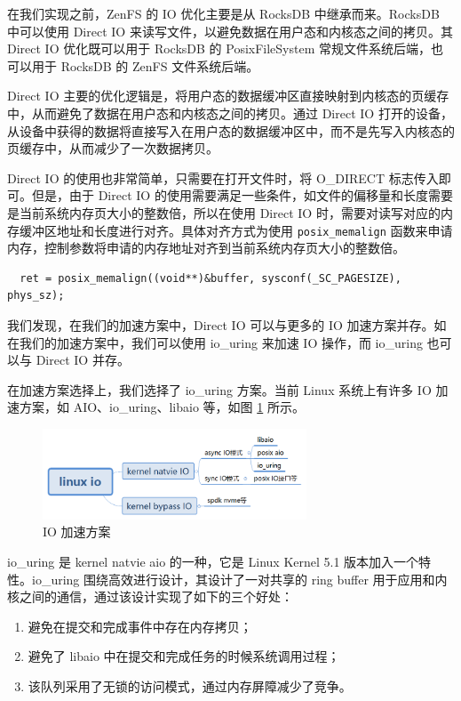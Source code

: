 在我们实现之前，ZenFS 的 IO 优化主要是从 RocksDB 中继承而来。RocksDB 中可以使用 Direct IO \cite{bjorling_linux_2013} 来读写文件，以避免数据在用户态和内核态之间的拷贝。其 Direct IO 优化既可以用于 RocksDB 的 PosixFileSystem 常规文件系统后端，也可以用于 RocksDB 的 ZenFS 文件系统后端。

Direct IO 主要的优化逻辑是，将用户态的数据缓冲区直接映射到内核态的页缓存中，从而避免了数据在用户态和内核态之间的拷贝。通过 Direct IO 打开的设备，从设备中获得的数据将直接写入在用户态的数据缓冲区中，而不是先写入内核态的页缓存中，从而减少了一次数据拷贝。

Direct IO 的使用也非常简单，只需要在打开文件时，将 O\_DIRECT 标志传入即可。但是，由于 Direct IO 的使用需要满足一些条件，如文件的偏移量和长度需要是当前系统内存页大小的整数倍，所以在使用 Direct IO 时，需要对读写对应的内存缓冲区地址和长度进行对齐。具体对齐方式为使用 \verb|posix_memalign| 函数来申请内存，控制参数将申请的内存地址对齐到当前系统内存页大小的整数倍。

\begin{lstlisting}
  ret = posix_memalign((void**)&buffer, sysconf(_SC_PAGESIZE), phys_sz);
\end{lstlisting}

我们发现，在我们的加速方案中，Direct IO 可以与更多的 IO 加速方案并存。如在我们的加速方案中，我们可以使用 io\_uring 来加速 IO 操作，而 io\_uring 也可以与 Direct IO 并存。

在加速方案选择上，我们选择了 io\_uring 方案。当前 Linux 系统上有许多 IO 加速方案，如 AIO、io\_uring、libaio 等，如图 \ref{io-speedup} 所示。

\begin{figure}[htbp]
  \centering
  \includegraphics[width=0.7\textwidth]{fig/io-speedup}
  \caption{IO 加速方案}
  \label{io-speedup}
\end{figure}

io\_uring 是 kernel natvie aio 的一种，它是 Linux Kernel 5.1 版本加入一个特性。io\_uring 围绕高效进行设计，其设计了一对共享的 ring buffer 用于应用和内核之间的通信，通过该设计实现了如下的三个好处：

\begin{enumerate}
  \item 避免在提交和完成事件中存在内存拷贝；
  \item 避免了 libaio 中在提交和完成任务的时候系统调用过程；
  \item 该队列采用了无锁的访问模式，通过内存屏障减少了竞争。
\end{enumerate}

